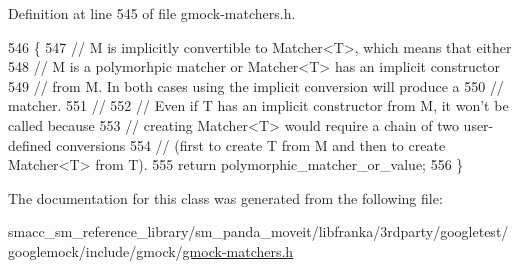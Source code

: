 Definition at line 545 of file gmock-\/matchers.\+h.


\begin{DoxyCode}
546                                                     \{
547     \textcolor{comment}{// M is implicitly convertible to Matcher<T>, which means that either}
548     \textcolor{comment}{// M is a polymorhpic matcher or Matcher<T> has an implicit constructor}
549     \textcolor{comment}{// from M.  In both cases using the implicit conversion will produce a}
550     \textcolor{comment}{// matcher.}
551     \textcolor{comment}{//}
552     \textcolor{comment}{// Even if T has an implicit constructor from M, it won't be called because}
553     \textcolor{comment}{// creating Matcher<T> would require a chain of two user-defined conversions}
554     \textcolor{comment}{// (first to create T from M and then to create Matcher<T> from T).}
555     \textcolor{keywordflow}{return} polymorphic\_matcher\_or\_value;
556   \}
\end{DoxyCode}


The documentation for this class was generated from the following file\+:\begin{DoxyCompactItemize}
\item 
smacc\+\_\+sm\+\_\+reference\+\_\+library/sm\+\_\+panda\+\_\+moveit/libfranka/3rdparty/googletest/googlemock/include/gmock/\hyperlink{gmock-matchers_8h}{gmock-\/matchers.\+h}\end{DoxyCompactItemize}
